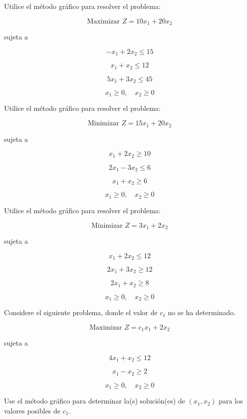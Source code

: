 \begin{Ejer} Utilice el m\'etodo gr\'afico para resolver el problema:

\[
\text{Maximizar } Z = 10x_1 + 20x_2
\]

sujeta a

\[
-x_1 + 2x_2 \le 15
\]

\[
x_1 + x_2 \le 12
\]

\[
5x_1 + 3x_2 \le 45
\]

\[
x_1 \ge 0,\quad x_2 \ge 0
\]


\end{Ejer}

\begin{Ejer} Utilice el m\'etodo gr\'afico para resolver el problema:

\[
\text{Minimizar } Z = 15x_1 + 20x_2
\]

sujeta a

\[
x_1 + 2x_2 \ge 10
\]

\[
2x_1 - 3x_2 \le 6
\]

\[
x_1 + x_2 \ge 6
\]

\[
x_1 \ge 0, \quad x_2 \ge 0
\]


\end{Ejer}


\begin{Ejer} Utilice el m\'etodo gr\'afico para resolver el problema:

\[
\text{Minimizar } Z = 3x_1 + 2x_2
\]

sujeta a

\[
x_1 + 2x_2 \le 12
\]

\[
2x_1 + 3x_2 \ge 12
\]

\[
2x_1 + x_2 \ge 8
\]

\[
x_1 \ge 0, \quad x_2 \ge 0
\]


\end{Ejer}


\begin{Ejer} Considere el siguiente problema, donde el valor de $c_1$ no se ha determinado.

\[
\text{Maximizar } Z = c_1 x_1 + 2x_2
\]

sujeta a

\[
4x_1 + x_2 \le 12
\]

\[
x_1 - x_2 \ge 2
\]

\[
x_1 \ge 0, \quad x_2 \ge 0
\]

Use el m\'etodo gr\'afico para determinar la(s) soluci\'on(es) de $(x_1,x_2)$ para los valores posibles de $c_1$.


\end{Ejer}



